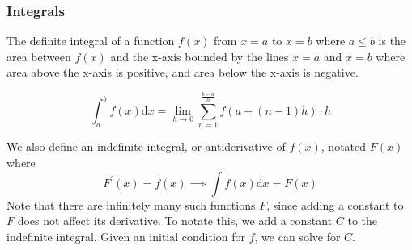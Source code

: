 \subsubsection{Integrals}
The definite integral of a function $f(x)$ from $x=a$ to $x=b$ where $a \leq b$ is the area between $f(x)$ and the x-axis bounded by the lines $x=a$ and $x=b$ where area above the x-axis is positive, and area below the x-axis is negative. 
\begin{definition}
	\begin{equation*}
		\int_{a}^{b}{f(x) \mathrm{d}x} = \lim\limits_{h \to 0}{\sum_{n=1}^{\frac{b-a}{h}}}{f(a + (n-1)h) \cdot h}
	\end{equation*}
\end{definition}

We also define an indefinite integral, or antiderivative of $f(x)$, notated $F(x)$ where
\begin{equation*}
F^\prime(x) = f(x) \implies \int{f(x)\mathrm{d}x} = F(x)
\end{equation*}
Note that there are infinitely many such functions $F$, since adding a constant to $F$ does not affect its derivative. To notate this, we add a constant $C$ to the indefinite integral. Given an initial condition for $f$, we can solve for $C$.\\

